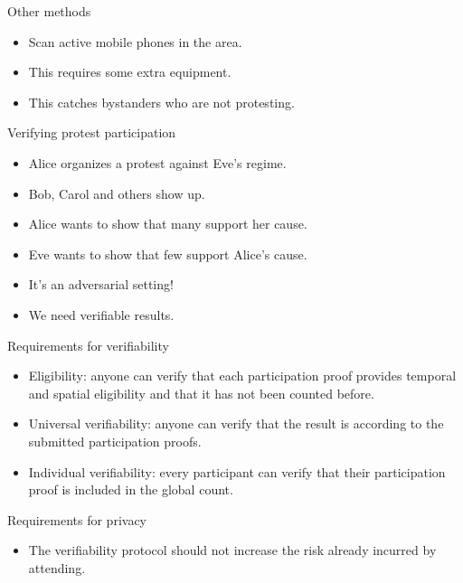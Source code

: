 \begin{columns}[t]
\begin{column}{0.32\linewidth}
    \begin{orangeblock}{Other methods}
      \begin{itemize}
        \item Scan active mobile phones in the area.
        \item This requires some extra equipment.
        \item This catches bystanders who are not protesting.
      \end{itemize}
    \end{orangeblock}

    \begin{redblock}{Verifying protest participation}
      \begin{itemize}
        \item Alice organizes a protest against Eve's regime.
        \item Bob, Carol and others show up.
        \item {\color{olive!10!green!90} Alice wants to show that many support 
            her cause.}
        \item {\color{red} Eve wants to show that few support Alice's cause.}
        \item It's an adversarial setting!
        \item We need verifiable results.
      \end{itemize}
    \end{redblock}

    \begin{blueblock}{Requirements for verifiability}
      \begin{itemize}
        \item\label{EligibilityVerif} Eligibility: anyone can verify that each 
          participation proof provides temporal and spatial eligibility and that 
          it has not been counted before.

        \item\label{UniversalVerif} Universal verifiability: anyone can verify 
          that the result is according to the submitted participation proofs.

        \item\label{IndividualVerif} Individual verifiability: every participant 
          can verify that their participation proof is included in the global 
          count.
      \end{itemize}
    \end{blueblock}

    \begin{blueblock}{Requirements for privacy}
      \begin{itemize}
        \item The verifiability protocol should not increase the risk already 
          incurred by attending.
      \end{itemize}
    \end{blueblock}


\end{column}
\end{columns}
